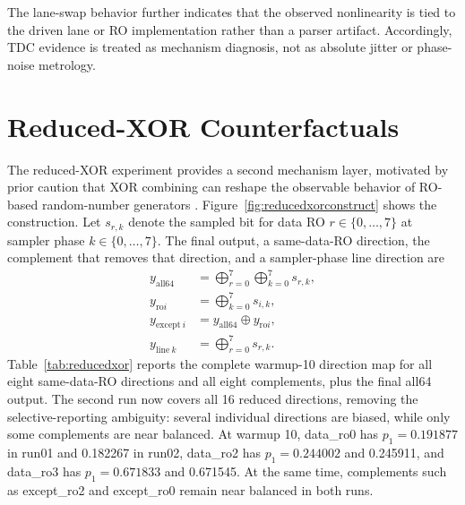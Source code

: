 \documentclass[journal]{IEEEtran}
\newcommand{\tdc}{TDC}
\begin{document}
The lane-swap behavior further indicates that the observed nonlinearity is tied to the driven lane or RO implementation rather than a parser artifact. Accordingly, \tdc{} evidence is treated as mechanism diagnosis, not as absolute jitter or phase-noise metrology.

\section{Reduced-XOR Counterfactuals}

The reduced-XOR experiment provides a second mechanism layer, motivated by prior caution that XOR combining can reshape the observable behavior of RO-based random-number generators \cite{Sato_2021}. Figure~\ref{fig:reducedxorconstruct} shows the construction. Let $s_{r,k}$ denote the sampled bit for data RO $r\in\{0,\ldots,7\}$ at sampler phase $k\in\{0,\ldots,7\}$. The final output, a same-data-RO direction, the complement that removes that direction, and a sampler-phase line direction are
\begin{align}
y_{\mathrm{all64}} &= \bigoplus_{r=0}^{7}\bigoplus_{k=0}^{7} s_{r,k},\\
y_{\mathrm{ro}i} &= \bigoplus_{k=0}^{7} s_{i,k},\\
y_{\mathrm{except}\ i} &= y_{\mathrm{all64}}\oplus y_{\mathrm{ro}i},\\
y_{\mathrm{line}\ k} &= \bigoplus_{r=0}^{7} s_{r,k}.
\end{align}
Table~\ref{tab:reducedxor} reports the complete warmup-10 direction map for all eight same-data-RO directions and all eight complements, plus the final all64 output. The second run now covers all 16 reduced directions, removing the selective-reporting ambiguity: several individual directions are biased, while only some complements are near balanced. At warmup 10, data\_ro0 has $p_1=0.191877$ in run01 and 0.182267 in run02, data\_ro2 has $p_1=0.244002$ and 0.245911, and data\_ro3 has $p_1=0.671833$ and 0.671545. At the same time, complements such as except\_ro2 and except\_ro0 remain near balanced in both runs.
\end{document}

